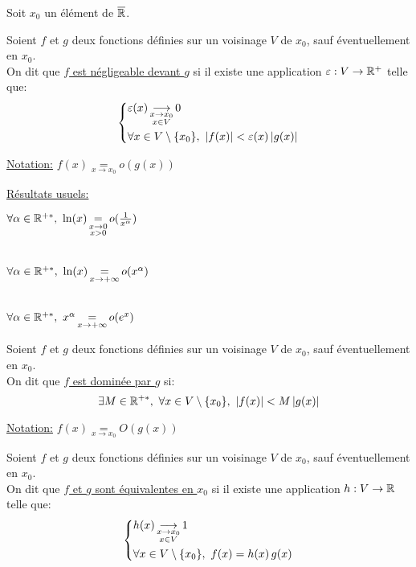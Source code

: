 \documentclass[12pt,twoside,a4paper]{article}
\author{MPSI 2}
\begin{document}
	\maketitle
	Soit $x_0$ un élément de $\overline{\mathbb{R}}$.
	\begin{defi}
		Soient $f$ et $g$ deux fonctions définies sur un voisinage $V$ de $x_0$, sauf éventuellement en $x_0$.\\
		On dit que \underline{$f$ est négligeable devant $g$} si il existe une application $\varepsilon:V\rightarrow\mathbb{R}^+$ telle que:
		$$\systeme{& \varepsilon(x)\mathop{\longrightarrow}\limits_{\substack{x\rightarrow x_0\\x\in V}}0\\&\forall x\in V\setminus \{x_0\},\ |f(x)|<\varepsilon(x)\,|g(x)| }$$
	\end{defi}
	\begin{flushleft}
		\underline{Notation:} $f(x)\mathop{=}\limits_{x\rightarrow x_0} o(g(x))$
	\end{flushleft}
	\begin{flushleft}
		\underline{Résultats usuels:}
		\begin{liste}
			\item $\forall \alpha\in\R^{+*},\ \ln(x)\mathop{=}\limits_{\substack{x\rightarrow 0\\x>0}}o(\frac1{x^\alpha})$\\\ \\
			\item $\forall \alpha\in\R^{+*},\ \ln(x)\mathop{=}\limits_{x\rightarrow +\infty} o(x^\alpha)$\\\ \\
			\item $\forall \alpha\in\R^{+*},\ x^\alpha\mathop{=}\limits_{x\rightarrow +\infty} o(e^x)$
		\end{liste}
	\end{flushleft}
	\begin{defi}
		Soient $f$ et $g$ deux fonctions définies sur un voisinage $V$ de $x_0$, sauf éventuellement en $x_0$.\\
		On dit que \underline{$f$ est dominée par $g$} si:
		$$\exists M\in\mathbb{R}^{+*},\ \forall x\in V\setminus \{x_0\},\ |f(x)|<M\,|g(x)|$$
	\end{defi}
	\begin{flushleft}
		\underline{Notation:} $f(x)\mathop{=}\limits_{x\rightarrow x_0} O(g(x))$
	\end{flushleft}
	\begin{defi}
		Soient $f$ et $g$ deux fonctions définies sur un voisinage $V$ de $x_0$, sauf éventuellement en $x_0$.\\
		On dit que \underline{$f$ et $g$ sont \'equivalentes en $x_0$} si il existe une application $h:V\rightarrow\mathbb{R}$ telle que:
		$$\left\{\begin{aligned}& h(x)\mathop{\longrightarrow}\limits_{\substack{x\rightarrow x_0\\x\in V}}1\\&\forall x\in V\setminus \{x_0\},\ f(x)=h(x)\,g(x) \end{aligned}\right.$$
	\end{defi}
\end{document}
